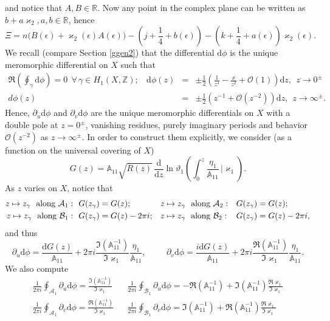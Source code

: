 \documentclass[10pt,oneside,reqno]{amsart}
\numberwithin{equation}{section}
\renewcommand{\d}{{\mathrm d}}
\begin{document}
and notice that $A,B\in\mathbb{R}$. Now any point in the complex plane can be written as $b+a\varkappa_2,a,b\in\mathbb{R}$, hence
\begin{equation*}
  \Xi=n\big(B(\epsilon)+\varkappa_2(\epsilon)A(\epsilon)\big)-\left(j+\frac{1}{4}+b(\epsilon)\right)-\left(k+\frac{1}{4}+a(\epsilon)\right)\varkappa_2(\epsilon).
\end{equation*}
We recall (compare Section \ref{ggen2}) that the differential $\d\phi$ is the unique meromorphic differential on $X$ such that
\begin{eqnarray*}
	\Re\left(\oint_{\gamma}\d\phi\right)=0\ \ \forall\,\gamma\in H_1(X,\mathbb{Z});\ \ \ \ \d\phi(z)&=&\pm\frac{1}{2}\left(\frac{1}{z^4}-\frac{x}{z^2}+\mathcal O(1)\right)\d z,\ \ z\rightarrow 0^{\pm}\\d\phi(z)&=&\pm\frac{1}{2}\left(z^{-1}+\mathcal O\left(z^{-2}\right)\right)\d z,\ \ z\rightarrow\infty^{\pm}.
\end{eqnarray*}
Hence, $\partial_u\d\phi$ and $\partial_v\d\phi$ are the unique meromorphic differentials on $X$ with a double pole at $z=0^{\pm}$, vanishing residues, purely imaginary periods and behavior $\mathcal O\left(z^{-2}\right)$ as $z\rightarrow\infty^{\pm}$. In order to construct them explicitly, we consider (as a function on the universal covering of $X$)
\begin{equation*}
 G(z) = \mathbb{A}_{11}\sqrt{R(z)}\,\frac{\d}{\d z}\ln\vartheta_1\left(\int_0^z\frac{\eta_1}{\mathbb{A}_{11}}\,\Big|\varkappa_1\right).
\end{equation*}
As $z$ varies on $X$, notice that
\begin{align*}
 z\mapsto z_{\gamma}\ \ \textnormal{along}\ \mathcal{A}_1:\ \ & G(z_{\gamma})=G(z);&& z\mapsto z_{\gamma}\ \ \textnormal{along}\ \mathcal{A}_2: && G(z_{\gamma}) = G(z);\\
 z\mapsto z_{\gamma}\ \ \textnormal{along}\ \mathcal{B}_1:\ \ & G(z_{\gamma})= G(z)-2\pi i;&&
  z\mapsto z_{\gamma}\ \ \textnormal{along}\ \mathcal{B}_2: && G(z_{\gamma})=G(z)-2\pi i,
\end{align*}
and thus
\begin{equation*}
	\partial_u\d\phi=\frac{\d G(z)}{\mathbb{A}_{11}}+2\pi i\frac{\Im(\mathbb{A}_{11}^{-1})}{\Im\varkappa_1}\frac{\eta_1}{\mathbb{A}_{11}},\hspace{1cm}
	\partial_v\d\phi=\frac{i\d G(z)}{\mathbb{A}_{11}}+2\pi i\frac{\Re(\mathbb{A}_{11}^{-1})}{\Im\varkappa_1}\frac{\eta_1}{\mathbb{A}_{11}}.
\end{equation*}
We also compute
\begin{eqnarray*}
	\frac{1}{2\pi i}\oint_{\mathcal{A}_1}\partial_u\d\phi=\frac{\Im(\mathbb{A}_{11}^{-1})}{\Im\varkappa_1}&&\frac{1}{2\pi i}\oint_{\mathcal{B}_1}\partial_u\d\phi =-\Re(\mathbb{A}_{11}^{-1})+\Im(\mathbb{A}_{11}^{-1})\frac{\Re\varkappa_1}{\Im\varkappa_1}\\
	\frac{1}{2\pi i}\oint_{\mathcal{A}_1}\partial_v\d\phi=\frac{\Re(\mathbb{A}_{11}^{-1})}{\Im\varkappa_1}&&\frac{1}{2\pi i}\oint_{\mathcal{B}_1}\partial_v\d\phi =\Im(\mathbb{A}_{11}^{-1})+\Re(\mathbb{A}_{11}^{-1})\frac{\Re\varkappa_1}{\Im\varkappa_1}
\end{eqnarray*}
\end{document}
